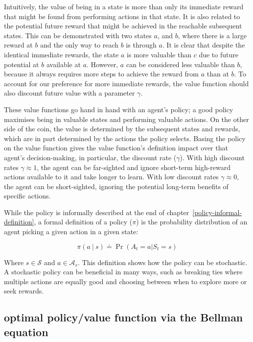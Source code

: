 \documentclass[]{final_report}
\begin{document}
Intuitively, the value of being in a state is more than only its immediate reward that might be found from performing actions in that state. It is also related to the potential future reward that might be achieved in the reachable subsequent states. This can be demonstrated with two states $a$, and $b$, where there is a large reward at $b$ and the only way to reach $b$ is through $a$. It is clear that despite the identical immediate rewards, the state $a$ is more valuable than $c$ due to future potential at $b$ available at $a$. However, $a$ can be considered less valuable than $b$, because it always requires more steps to achieve the reward from $a$ than at $b$. To account for our preference for more immediate rewards, the value function should also discount future value with a parameter $\gamma$. 

These value functions go hand in hand with an agent's policy; a good policy maximises being in valuable states and performing valuable actions. On the other side of the coin, the value is determined by the subsequent states and rewards, which are in part determined by the actions the policy selects. Basing the policy on the value function gives the value function's definition impact over that agent's decision-making, in particular, the\label{discount-rate-introduction} discount rate ($\gamma$). With high discount rates $\gamma \approx 1$, the agent can be far-sighted and ignore short-term high-reward actions available to it and take longer to learn. With low discount rates $\gamma \approx 0$, the agent can be short-sighted, ignoring the potential long-term benefits of specific actions.

While the policy is informally described at the end of chapter~\ref{policy-informal-definition}, a formal definition of a policy ($\pi$) is the probability distribution of an agent picking a given action in a given state:

\begin{equation}
  \pi(a \ |\ s) \doteq \Pr(A_t = a | S_t = s)
  \label{eqn:policy-def}
\end{equation}



Where $s \in \mathcal{S}$ and $a \in \mathcal{A}_s$. This definition shows how the policy can be stochastic. A stochastic policy can be beneficial in many ways, such as breaking ties where multiple actions are equally good and choosing between when to explore more or seek rewards. 

\subsection{optimal policy/value function via the Bellman equation}
\end{document}
